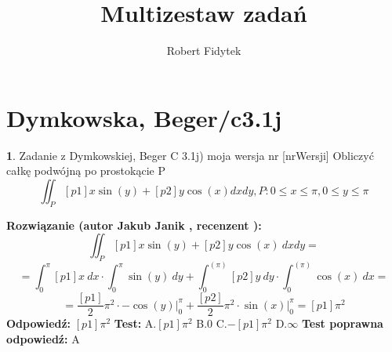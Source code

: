 \documentclass[12pt, a4paper]{article}
\title{Multizestaw zadań}
\author{Robert Fidytek}
\date{}
\theoremstyle{definition} %
\newtheorem{zad}{}
\newcommand{\kategoria}[1]{\section{#1}} %
\newcommand{\zadStart}[1]{\begin{zad}#1\newline} %
\newcommand{\zadStop}{\end{zad}}   %
\newcommand{\rozwStart}[2]{\noindent \textbf{Rozwiązanie (autor #1 , recenzent #2): }\newline} %
\newcommand{\rozwStop}{\newline}                                            %
\newcommand{\odpStart}{\noindent \textbf{Odpowiedź:}\newline}    %
\newcommand{\odpStop}{\newline}                                             %
\newcommand{\testStart}{\noindent \textbf{Test:}\newline} %
\newcommand{\testStop}{\newline} %
\newcommand{\kluczStart}{\noindent \textbf{Test poprawna odpowiedź:}\newline} %
\newcommand{\kluczStop}{\newline} %
\begin{document}
\maketitle


\kategoria{Dymkowska, Beger/c3.1j}
\zadStart{Zadanie z Dymkowskiej, Beger C 3.1j) moja wersja nr [nrWersji]}
Obliczyć całkę podwójną po prostokącie P $$\iint_P [p1]x\sin{(y)}+[p2]y\cos{(x)}dxdy, P: 0\leq x \leq \pi, 0 \leq y \leq \pi$$
\zadStop
\rozwStart{Jakub Janik}{}
$$\iint_P [p1]x\sin{(y)}+[p2]y\cos{(x)}\ dxdy=$$
$$=\int_0^{\pi}[p1] x\ dx \cdot\int_0^{\pi}\sin{(y)}\ dy+\int_0^{(\pi)}[p2]y\ dy \cdot \int_0^{(\pi)} \cos{(x)}\ dx=$$
$$=\frac{[p1]}{2}\pi^2 \cdot -\cos{(y)}\Big|_0^{\pi}+\frac{[p2]}{2}\pi^2\cdot \sin{(x)}\Big|_0^{\pi}=[p1]\pi^2$$
\rozwStop
\odpStart
$[p1]\pi^2$
\odpStop
\testStart
A.$[p1]\pi^2$
B.$0$
C.$-[p1]\pi^2$
D.$\infty$
\testStop
\kluczStart
A
\kluczStop
\end{document}

